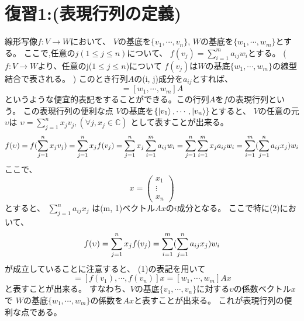 \section{\Large 復習1:(表現行列の定義)}
\setcounter{equation}{0}
線形写像$f:V \to W$において、
$V$の基底を$\{v_1, \cdots, v_n\}$, $W$の基底を$\{w_1,\cdots, w_m\}$とする。
\newline
ここで,任意の$j (1\leq j\leq n)$について、
$f(v_j) = \sum_{i=1}^m a_{ij}w_i$とする。
\newline
($f:V \to W$より、任意のj($1\leq j\leq n$)について
$f(v_j)$は$W$の基底$\{w_1, \cdots, w_m\}$の線型結合で表される。
)
\newline
このとき行列$A$の(i, j)成分を$a_{ij}$とすれば、 
\begin{equation}
[f(v_1), \cdots, f(v_n)] = [w_1, \cdots, w_m]A
\end{equation}
というような便宜的表記をすることができる。この行列$A$を$f$の表現行列という。
\newline
 この表現行列の便利な点
\newline
$V$の基底を$\{\ket{v_1},\cdots, \ket{v_n}\}$とすると、 
$V$の任意の元$\upsilon$は
$\upsilon = \sum_{j=1}^n x_j v_j, (\forall j, x_j \in \mathbb{C})$
として表すことが出来る。
\newline
\begin{equation}
f(\upsilon) \newline
=f(\sum_{j=1}^n x_j v_j) \\ 
=\sum_{j=1}^n x_j f(v_j) \\
=\sum_{j=1}^n x_j \sum_{i=1}^m a_{ij}w_i \\
=\sum_{j=1}^n \sum_{i=1}^m x_j a_{ij}w_i \\
=\sum_{i=1}^m (\sum_{j=1}^n a_{ij} x_j)w_i
\end{equation}
ここで、
\[x = \left(
	\begin{array}{c}
	x_1 \\
	\vdots \\
	x_n
	\end{array}
	\right)
\]
とすると、
$\sum_{j=1}^n a_{ij} x_j$
は(m, 1)ベクトル$Ax$の$i$成分となる。
\newline
ここで特に(2)において、
\begin{equation}
f(\upsilon)
=\sum_{j=1}^n x_j f(v_j) \\
=\sum_{i=1}^m (\sum_{j=1}^n a_{ij} x_j)w_i
\end{equation}
が成立していることに注意すると、
(1)の表記を用いて
\begin{equation}
[f(\upsilon)]=[f(v_1), \cdots, f(v_n)]x
 = [w_1, \cdots, w_m]Ax
\end{equation}
と表すことが出来る。
すなわち、$V$の基底$\{v_1,\cdots, v_n\}$に対する$\upsilon$の係数ベクトル$x$
で $W$の基底$\{w_1,\cdots, w_m\}$の係数を$Ax$と表すことが出来る。
これが表現行列の便利な点である。
